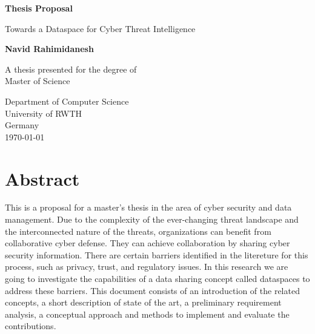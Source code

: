 \documentclass{article}
\author{Navid Rahimidanesh}
\date{March 2023}
\begin{document}

\begin{titlepage}
    \begin{center}
        \vspace*{1cm}
        
        \huge
        \textbf{Thesis Proposal}
        
        \vspace{0.5cm}
        \LARGE
        Towards a Dataspace for Cyber Threat Intelligence
        
        \vspace{1.5cm}
        
        \textbf{Navid Rahimidanesh}
        
        \vfill
        
        A thesis presented for the degree of\\
        Master of Science
        
        \vspace{0.8cm}
        
        
        \Large
        Department of Computer Science\\
        University of RWTH\\
        Germany\\
        \today
        
    \end{center}
\end{titlepage}

\tableofcontents

\newpage

\section{Abstract}

This is a proposal for a master's thesis in the area of cyber security and data management. Due to the complexity of the ever-changing threat landscape and the interconnected nature of the threats, organizations can benefit from collaborative cyber defense. They can achieve collaboration by sharing cyber security information. There are certain barriers identified in the litereture for this process, such as privacy, trust, and regulatory issues. In this research we are going to investigate the capabilities of a data sharing concept called dataspaces to address these barriers. This document consists of an introduction of the related concepts, a short description of state of the art, a preliminary requirement analysis, a conceptual approach and methods to implement and evaluate the contributions.
\end{document}
